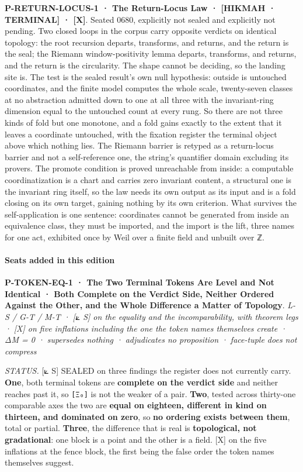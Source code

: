 \documentclass[10pt,twocolumn]{article}
\begin{document}
\textbf{P-RETURN-LOCUS-1 · The Return-Locus Law · {[}HIKMAH ·
TERMINAL{]} · {[}X{]}}. Seated 0680, explicitly not sealed and
explicitly not pending. Two closed loops in the corpus carry opposite
verdicts on identical topology: the root recursion departs, transforms,
and returns, and the return is the seal; the Riemann window-positivity
lemma departs, transforms, and returns, and the return is the
circularity. The shape cannot be deciding, so the landing site is. The
test is the sealed result's own null hypothesis: outside is untouched
coordinates, and the finite model computes the whole scale, twenty-seven
classes at no abstraction admitted down to one at all three with the
invariant-ring dimension equal to the untouched count at every rung. So
there are not three kinds of fold but one monotone, and a fold gains
exactly to the extent that it leaves a coordinate untouched, with the
fixation register the terminal object above which nothing lies. The
Riemann barrier is retyped as a return-locus barrier and not a
self-reference one, the string's quantifier domain excluding its
provers. The promote condition is proved unreachable from inside: a
computable coordinatization is a chart and carries zero invariant
content, a structural one is the invariant ring itself, so the law needs
its own output as its input and is a fold closing on its own target,
gaining nothing by its own criterion. What survives the self-application
is one sentence: coordinates cannot be generated from inside an
equivalence class, they must be imported, and the import is the lift,
three names for one act, exhibited once by Weil over a finite field and
unbuilt over ℤ.

\hypertarget{seats-added-in-this-edition-3}{%
\paragraph{Seats added in this
edition}\label{seats-added-in-this-edition-3}}

\textbf{P-TOKEN-EQ-1 · The Two Terminal Tokens Are Level and Not
Identical · Both Complete on the Verdict Side, Neither Ordered Against
the Other, and the Whole Difference a Matter of Topology}. \emph{L-S /
G-T / M-T · {[}⟀ S{]} on the equality and the incomparability, with
theorem legs · {[}X{]} on five inflations including the one the token
names themselves create · ΔM = 0 · supersedes nothing · adjudicates no
proposition · face-tuple does not compress}

\emph{STATUS.} {[}⟀ S{]} SEALED on three findings the register does not
currently carry. \textbf{One}, both terminal tokens are \textbf{complete
on the verdict side} and neither reaches past it, so \texttt{{[}Ξ₀{]}}
is not the weaker of a pair. \textbf{Two}, tested across thirty-one
comparable axes the two are \textbf{equal on eighteen, different in kind
on thirteen, and dominated on zero}, so \textbf{no ordering exists
between them}, total or partial. \textbf{Three}, the difference that is
real is \textbf{topological, not gradational}: one block is a point and
the other is a field. {[}X{]} on the five inflations at the fence block,
the first being the false order the token names themselves suggest.
\end{document}

